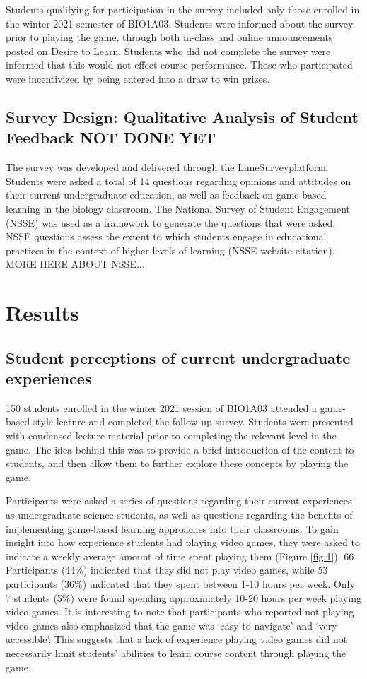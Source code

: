 \documentclass[10pt]{article}
\providecommand{\figref}[1]{(Figure \ref{#1})}  %
\begin{document}
Students qualifying for participation in the survey included only those enrolled in the winter 2021 semester of BIO1A03. Students were informed about the survey prior to playing the game, through both in-class and online announcements posted on Desire to Learn. Students who did not complete the survey were informed that this would not effect course performance. Those who participated were incentivized by being entered into a draw to win prizes.

\subsection{Survey Design: Qualitative Analysis of Student Feedback NOT DONE YET}

The survey was developed and delivered through the LimeSurvey\textregistered \space platform. Students were asked a total of 14 questions regarding opinions and attitudes on their current undergraduate education, as well as feedback on game-based learning in the biology classroom. The National Survey of Student Engagement (NSSE) was used as a framework to generate the questions that were asked. NSSE questions assess the extent to which students engage in educational practices in the context of higher levels of learning (NSSE website citation). MORE HERE ABOUT NSSE...
\newpage

\section{Results}

\subsection{Student perceptions of current undergraduate experiences}

150 students enrolled in the winter 2021 session of BIO1A03 attended a game-based style lecture and completed the follow-up survey. Students were presented with condensed lecture material prior to completing the relevant level in the game. The idea behind this was to provide a brief introduction of the content to students, and then allow them to further explore these concepts by playing the game. 

Participants were asked a series of questions regarding their current experiences as undergraduate science students, as well as questions regarding the benefits of implementing game-based learning approaches into their classrooms. To gain insight into how experience students had playing video games, they were asked to indicate a weekly average amount of time spent playing them \figref{fig:1}. 66 Participants (44\%) indicated that they did not play video games, while 53 participants (36\%) indicated that they spent between 1-10 hours per week. Only 7 students (5\%) were found spending approximately 10-20 hours per week playing video games. It is interesting to note that participants who reported not playing video games also emphasized that the game was `easy to navigate' and `very accessible'. This suggests that a lack of experience playing video games did not necessarily limit students' abilities to learn course content through playing the game.
\end{document}
